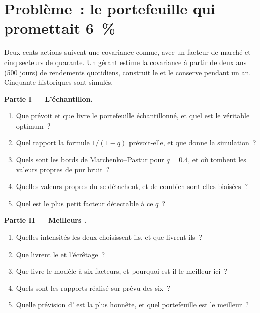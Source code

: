 \section{Problème~: le portefeuille qui promettait 6~\%}

\begin{problem}\label{pb:qm:covariance-estimation-and-random-matrices:1}
Deux cents actions suivent une covariance connue, avec un facteur de marché et cinq secteurs de quarante. Un gérant estime la covariance à partir de deux ans (500 jours) de rendements quotidiens, construit le
 et le conserve pendant un an. Cinquante historiques sont simulés.

\medskip\noindent\textbf{Partie I --- L'échantillon.}
\begin{enumerate}
\item Que prévoit et que livre le portefeuille échantillonné, et quel est le véritable optimum~?
\item Quel rapport la formule $1/(1 - q)$ prévoit-elle, et que donne la simulation~?
\item Quels sont les bords de Marchenko--Pastur pour $q = 0.4$, et où tombent les valeurs propres de pur bruit~?
\item Quelles valeurs propres du  se détachent, et de combien sont-elles biaisées~?
\item Quel est le plus petit facteur détectable à ce $q$~?
\end{enumerate}

\medskip\noindent\textbf{Partie II --- Meilleurs .}
\begin{enumerate}[resume]
\item Quelles intensités les deux  choisissent-ils, et que livrent-ils~?
\item Que livrent le  et l'écrêtage~?
\item Que livre le modèle à six facteurs, et pourquoi est-il le meilleur ici~?
\item Quels sont les rapports réalisé sur prévu des six~?
\item Quelle prévision d' est la plus honnête, et quel portefeuille est le meilleur~?
\end{enumerate}


\end{problem}
